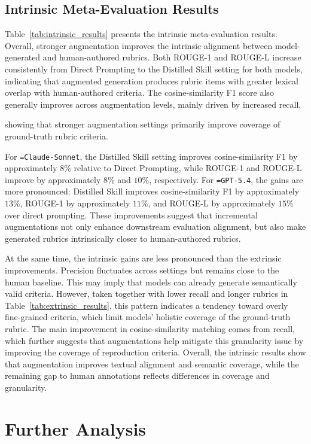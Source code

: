 \documentclass[11pt]{article}
\newif\ifreview
\newcommand{\hh}[1]{%
\ifreview
{\textcolor{orange!90!black}{#1}}
\else
#1
\fi
}
\newcommand{\hyphentt}[1]{\texttt{\hyphenchar\font=\defaulthyphenchar #1}}
\begin{document}
\subsection{Intrinsic Meta-Evaluation Results}

Table~\ref{tab:intrinsic_results} presents the intrinsic meta-evaluation results. Overall, stronger augmentation improves the intrinsic alignment between model-generated and human-authored rubrics. Both ROUGE-1 and ROUGE-L increase consistently from Direct Prompting to the Distilled Skill setting for both models, indicating that augmented generation produces rubric items with greater lexical overlap with human-authored criteria. The cosine-similarity F1 score also generally improves across augmentation levels, mainly driven by increased recall, \hh{showing that stronger augmentation settings primarily improve coverage of ground-truth rubric criteria.}

For \hyphentt{Claude-Sonnet}, the Distilled Skill setting improves cosine-similarity F1 by approximately $8\%$ relative to Direct Prompting, while ROUGE-1 and ROUGE-L improve by approximately $8\%$ and $10\%$, respectively. For \hyphentt{GPT-5.4}, the gains are more pronounced: Distilled Skill improves cosine-similarity F1 by approximately $13\%$, ROUGE-1 by approximately $11\%$, and ROUGE-L by approximately $15\%$ over direct prompting. These improvements suggest that incremental augmentations not only enhance downstream evaluation alignment, but also make generated rubrics intrinsically closer to human-authored rubrics.

At the same time, the intrinsic gains are less pronounced than the extrinsic improvements. Precision fluctuates across settings but remains close to the human baseline. This may imply that models can already generate semantically valid criteria. However, taken together with lower recall and longer rubrics in Table~\ref{tab:extrinsic_results}, this pattern indicates a tendency toward overly fine-grained criteria, which limit models' holistic coverage of the ground-truth rubric. The main improvement in cosine-similarity matching comes from recall,  which further suggests that augmentations help mitigate this granularity issue by improving the coverage of reproduction criteria. Overall, the intrinsic results show that augmentation improves textual alignment and semantic coverage, while the remaining gap to human annotations reflects differences in coverage and granularity.



\section{Further Analysis}
\end{document}
